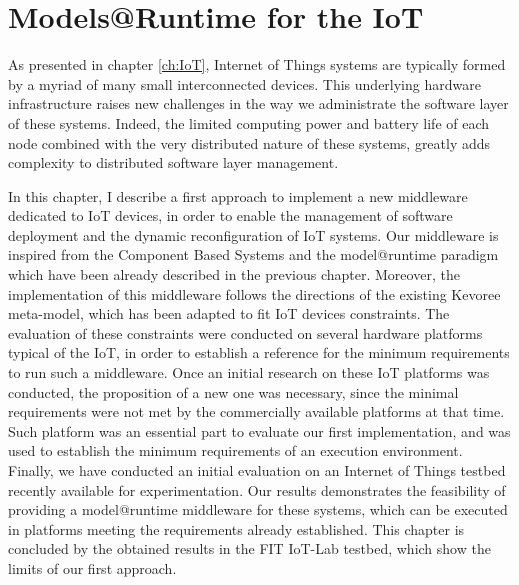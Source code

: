 \chapter{Models@Runtime for the IoT}
\label{ch:MARContiki}
As presented in chapter \ref{ch:IoT}, Internet of Things systems are typically formed by a myriad of many small interconnected devices.
This underlying hardware infrastructure raises new challenges in the way we administrate the software layer of these systems.
Indeed, the limited computing power and battery life of each node combined with the very distributed nature of these systems, greatly adds complexity to distributed software layer management.

In this chapter, I describe a first approach to implement a new middleware dedicated to IoT devices, in order to enable the management of software deployment and the dynamic reconfiguration of IoT systems.
Our middleware is inspired from the Component Based Systems and the model@runtime paradigm which have been already described in the previous chapter.
Moreover, the implementation of this middleware follows the directions of the existing Kevoree meta-model\todo{\cite{}}, which has been adapted to fit IoT devices constraints. 
The evaluation of these constraints were conducted on several hardware platforms typical of the IoT, in order to establish a reference for the minimum requirements to run such a middleware.
Once an initial research on these IoT platforms was conducted, the proposition of a new one was necessary, since the minimal requirements were not met by the commercially available platforms at that time.
Such platform was an essential part to evaluate our first implementation, and was used to establish the minimum requirements of an execution environment.
Finally, we have conducted an initial evaluation on an Internet of Things testbed\cite{Fleury15iotlab} recently available for experimentation.
Our results demonstrates the feasibility of providing a model@runtime middleware for these systems, which can be executed in platforms meeting the requirements already established.
This chapter is concluded by the obtained results in the FIT IoT-Lab testbed, which show the limits of our first approach.

